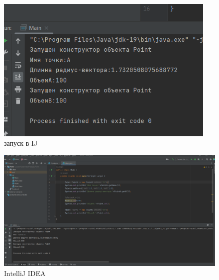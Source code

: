﻿\documentclass[a4paper, 12pt]{extarticle}
\begin{document}
\begin{figure}[H]
    \centering
    \includegraphics[width=300pt]{Test1.png}
    \caption{запуск в IJ}
    \label{fig:my_label}
\end{figure}

\begin{figure}[H]
    \centering
    \includegraphics[width=\linewidth]{Test2.png}
    \caption{IntelliJ IDEA}
    \label{fig:my_label}
\end{figure}
\end{document}
